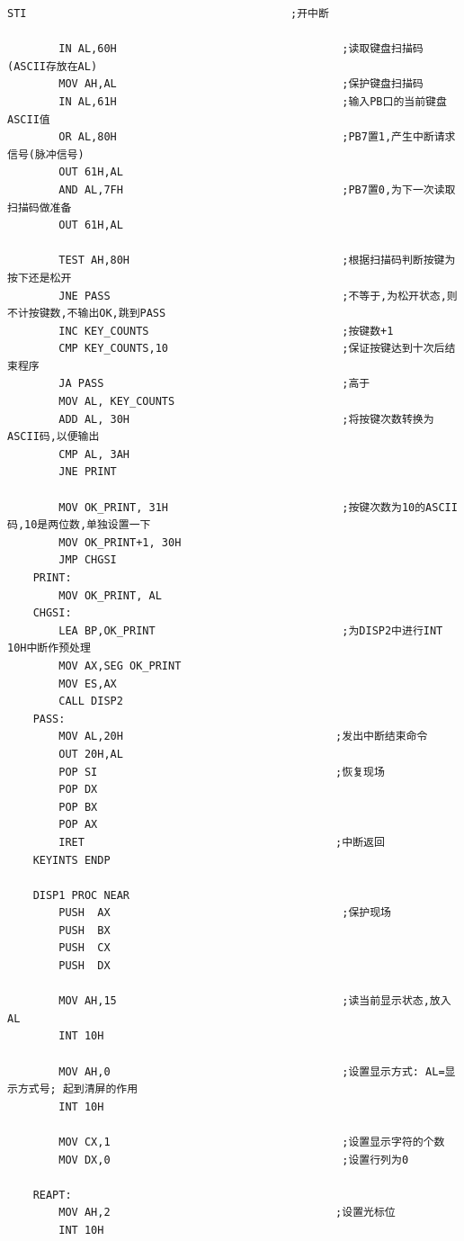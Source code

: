 \documentclass[11pt]{SEU-Digital-Report}
\begin{document}
\begin{lstlisting}[language={[x86masm]Assembler},title=code]
        STI                                         ;开中断

        IN AL,60H                                   ;读取键盘扫描码(ASCII存放在AL)
        MOV AH,AL                                   ;保护键盘扫描码               
        IN AL,61H                                   ;输入PB口的当前键盘ASCII值
        OR AL,80H                                   ;PB7置1,产生中断请求信号(脉冲信号)
        OUT 61H,AL
        AND AL,7FH                                  ;PB7置0,为下一次读取扫描码做准备
        OUT 61H,AL

        TEST AH,80H                                 ;根据扫描码判断按键为按下还是松开
        JNE PASS                                    ;不等于,为松开状态,则不计按键数,不输出OK,跳到PASS
        INC KEY_COUNTS                              ;按键数+1
        CMP KEY_COUNTS,10                           ;保证按键达到十次后结束程序
        JA PASS                                     ;高于
        MOV AL, KEY_COUNTS
        ADD AL, 30H                                 ;将按键次数转换为ASCII码,以便输出
        CMP AL, 3AH
        JNE PRINT

        MOV OK_PRINT, 31H                           ;按键次数为10的ASCII码,10是两位数,单独设置一下
        MOV OK_PRINT+1, 30H
        JMP CHGSI
    PRINT:  
        MOV OK_PRINT, AL
    CHGSI:  
        LEA BP,OK_PRINT                             ;为DISP2中进行INT 10H中断作预处理
        MOV AX,SEG OK_PRINT                        
        MOV ES,AX
        CALL DISP2
    PASS:
        MOV AL,20H                                 ;发出中断结束命令
        OUT 20H,AL
        POP SI                                     ;恢复现场
        POP DX
        POP BX
        POP AX
        IRET                                       ;中断返回
    KEYINTS ENDP

    DISP1 PROC NEAR
        PUSH  AX                                    ;保护现场
        PUSH  BX
        PUSH  CX
        PUSH  DX

        MOV AH,15                                   ;读当前显示状态,放入AL
        INT 10H

        MOV AH,0                                    ;设置显示方式: AL=显示方式号; 起到清屏的作用
        INT 10H

        MOV CX,1                                    ;设置显示字符的个数
        MOV DX,0                                    ;设置行列为0

    REAPT:
        MOV AH,2                                   ;设置光标位
        INT 10H


\end{lstlisting}
\end{document}
